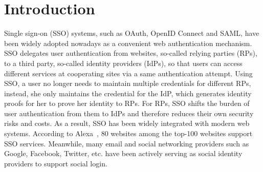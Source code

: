 \section{Introduction}
\label{sec:intro}




Single sign-on (SSO) systems, such as OAuth, OpenID Connect and SAML, have been widely adopted nowadays as a convenient web authentication mechanism. SSO delegates user authentication from websites, so-called relying parties (RPs), to a third party, so-called identity providers (IdPs), so that users can access different services at cooperating sites via a same authentication attempt. Using SSO, a user no longer needs to maintain multiple credentials for different RPs, instead, she only maintains the credential for the IdP, which generates identity proofs for her to prove her identity to RPs.
For RPs, SSO shifts the burden of user authentication from them to IdPs and therefore reduces their own security risks and costs. As a result, SSO has been widely integrated with modern web systems.
According to Alexa~\cite{Alexa}, 80 websites among the top-100 websites support SSO services.
Meanwhile, many email and social networking providers such as Google, Facebook, Twitter, etc. have been actively serving as social identity providers to support social login.


